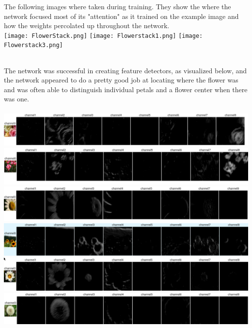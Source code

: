 \documentclass{article}
\begin{document}
The following images where taken during training. They show the where the network focused most of its "attention" as it trained on the example image and how the weights percolated up throughout the network. 
\hfill \\

\texttt{[image: FlowerStack.png]}
\texttt{[image: Flowerstack1.png]}
\texttt{[image: Flowerstack3.png]}



\hfill \\
The network was successful in creating feature detectors, as visualized below, and the network appeared to do a pretty good job at locating where the flower was and was often able to distinguish individual petals and a flower center when there was one. \\
\hfill \\

\includegraphics[width=1.0\linewidth]{CHANNELUSE.png} 
\includegraphics[width=1.0\linewidth]{CHANNELUSE2.png} 
\includegraphics[width=1.0\linewidth]{CHANNELUSE3.png} 
\includegraphics[width=1.0\linewidth]{CHANNELUSE4.png} 
\includegraphics[width=1.0\linewidth]{CHANNELUSE5.png} 
\includegraphics[width=1.0\linewidth]{CHANNELUSE6.png} 
\hfill \\
\end{document}
